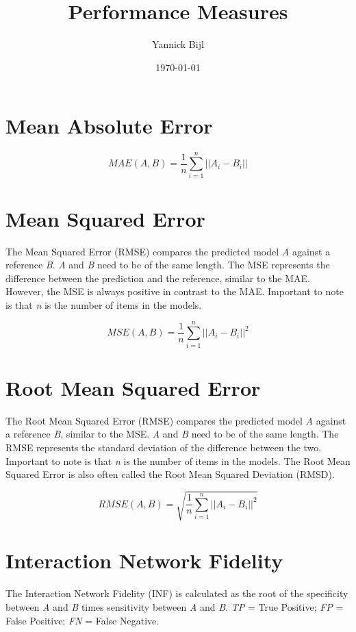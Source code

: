 \documentclass{article}
\title{Performance Measures}
\author{Yannick Bijl}
\date{\today}
\begin{document}
\maketitle

\tableofcontents
\newpage

\section{Mean Absolute Error}

\begin{equation}
    \label{eq:mse}
    MAE(A, B) = \frac{1}{n} \sum_{i=1}^{n} ||A_i - B_i||
\end{equation}


\section{Mean Squared Error}
The Mean Squared Error (RMSE) compares the predicted model \textit{A} against a reference \textit{B}. \textit{A} and \textit{B} need to be of the same length. The MSE represents the difference between the prediction and the reference, similar to the MAE. However, the MSE is always positive in contrast to the MAE. Important to note is that \textit{n} is the number of items in the models.

\begin{equation}
    \label{eq:mse}
    MSE(A, B) = \frac{1}{n} \sum_{i=1}^{n} ||A_i - B_i||^2
\end{equation}

\section{Root Mean Squared Error}
The Root Mean Squared Error (RMSE) compares the predicted model \textit{A} against a reference \textit{B}, similar to the MSE. \textit{A} and \textit{B} need to be of the same length. The RMSE represents the standard deviation of the difference between the two. Important to note is that \textit{n} is the number of items in the models. The Root Mean Squared Error is also often called the Root Mean Squared Deviation (RMSD).

\begin{equation}
    \label{eq:rmse}
    RMSE(A, B) = \sqrt{\frac{1}{n} \sum_{i=1}^{n} ||A_i - B_i||^2}
\end{equation}

\section{Interaction Network Fidelity}
The Interaction Network Fidelity (INF) is calculated as the root of the specificity between \textit{A} and \textit{B} times sensitivity between \textit{A} and \textit{B}. \textit{TP} = True Positive; \textit{FP} = False Positive; \textit{FN} = False Negative.
\end{document}
